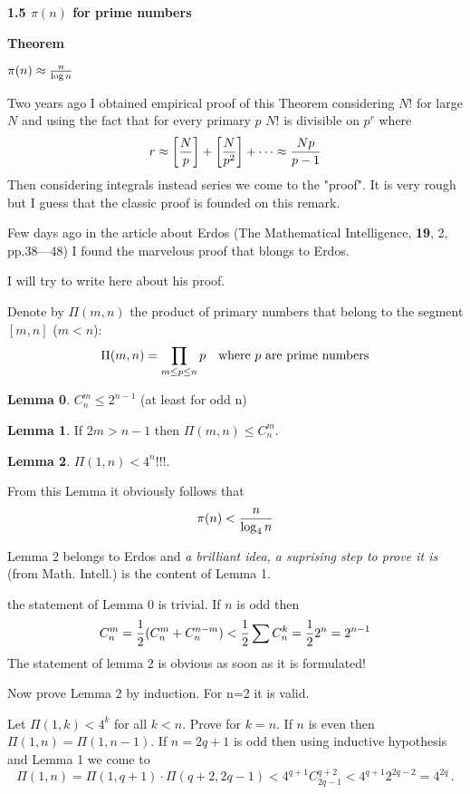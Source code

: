 
                  \centerline {\bf 1.5 $\pi(n)$ for prime numbers}

 {\bf Theorem}

           $\pi(n)\approx {n\over \log n}$



Two years ago I obtained  empirical proof of this Theorem
 considering $N!$ for large $N$ and using the fact that
 for every primary $p$ $N!$ is divisible on $p^r$
 where
   $$
  r\approx \left[N\over p\right]+\left[N\over p^2\right]+\dots
  \approx {Np\over p-1}
         $$
Then considering integrals instead series we come to the "proof".
It is very rough but I guess that the classic proof is founded on
this remark.

\smallskip

Few days ago in the article about Erdos (The Mathematical Intelligence,
{\bf 19}, 2, pp.38---48) I found the marvelous proof that blongs to Erdos.

I will try to write here about his proof.

  Denote by $\Pi (m,n)$ the product of primary numbers
  that belong to the segment $[m,n]$ ($m<n$):
                      $$
                      \Pi(m,n)=\prod_{m\leq p\leq n} p
                      \quad \hbox {where $p$ are prime numbers}
                      $$

  {\bf Lemma 0}.   $C^m_n\leq 2^{n-1}$ (at least for odd n)

\medskip

  {\bf Lemma 1}. If $2m>n-1$ then $\Pi(m,n)\leq C^m_n$.

\medskip

  {\bf Lemma 2}. $\Pi (1,n)<4^n$!!!.

 From this Lemma it obviously follows that
               $$
          \pi(n)<{n\over \log_4 n}
          $$

\medskip

  Lemma 2 belongs to Erdos and
  {\it a brilliant idea, a suprising step
     to prove it is} (from Math. Intell.) is the  content of Lemma 1.

 the statement of Lemma 0 is trivial. If $n$ is odd then
                  $$
   C^m_n={1\over 2}(C^m_n+C^{n-m}_n)<{1\over 2}\sum C^k_n=
         {1\over 2}2^n=2^{n-1}
                   $$
 The statement of lemma 2 is obvious as soon as it is formulated!

 Now prove Lemma 2 by induction. For n=2 it is valid.

 Let $\Pi (1,k)<4^k$ for all $k<n$. Prove for $k=n$.
 If $n$ is even then $\Pi(1,n)=\Pi(1,n-1)$.
 If $n=2q+1$ is odd then using inductive hypothesis and Lemma 1
  we come to
 $$
 \Pi(1,n)=\Pi(1,q+1)\cdot\Pi(q+2,2q-1)<4^{q+1}C^{q+2}_{2q-1}<
     4^{q+1}2^{2q-2}=4^{2q}\,.$$

 \bye
